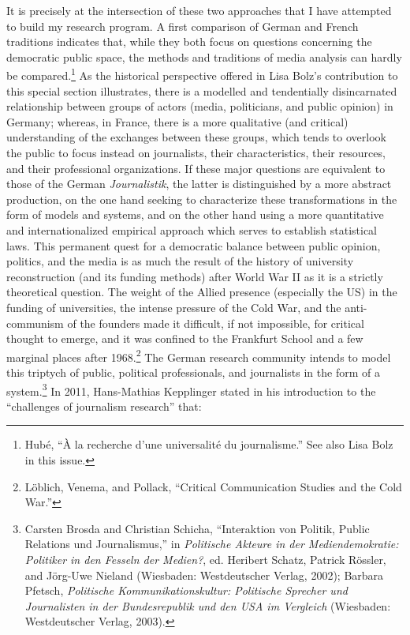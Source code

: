 \documentclass{tufte-handout}
\begin{document}
It is precisely at the intersection of these two approaches that I have
attempted to build my research program. A first comparison of German and
French traditions indicates that, while they both focus on questions
concerning the democratic public space, the methods and traditions of
media analysis can hardly be compared.\footnote{Hubé, ``À la recherche
  d'une universalité du journalisme.'' See also Lisa Bolz in this issue.}
As the historical perspective offered in Lisa Bolz's contribution to
this special section illustrates, there is a modelled and tendentially
disincarnated relationship between groups of actors (media, politicians,
and public opinion) in Germany; whereas, in France, there is a more
qualitative (and critical) understanding of the exchanges between these
groups, which tends to overlook the public to focus instead on
journalists, their characteristics, their resources, and their
professional organizations. If these major questions are equivalent to
those of the German \emph{Journalistik}, the latter is distinguished by
a more abstract production, on the one hand seeking to characterize
these transformations in the form of models and systems, and on the
other hand using a more quantitative and internationalized empirical
approach which serves to establish statistical laws. This permanent
quest for a democratic balance between public opinion, politics, and the
media is as much the result of the history of university reconstruction
(and its funding methods) after World War II as it is a strictly
theoretical question. The weight of the Allied presence (especially the
US) in the funding of universities, the intense pressure of the Cold
War, and the anti-communism of the founders made it difficult, if not
impossible, for critical thought to emerge, and it was confined to the
Frankfurt School and a few marginal places after 1968.\footnote{Löblich,
  Venema, and Pollack, ``Critical Communication Studies and the Cold
  War.''} The German research community intends to model this triptych
of public, political professionals, and journalists in the form of a
system.\footnote{Carsten Brosda and Christian Schicha, ``Interaktion von
  Politik, Public Relations und Journalismus,'' in \emph{Politische
  Akteure in der Mediendemokratie: Politiker in den Fesseln der
  Medien?}, ed. Heribert Schatz, Patrick Rössler, and Jörg-Uwe Nieland
  (Wiesbaden: Westdeutscher Verlag, 2002); Barbara Pfetsch,
  \emph{Politische Kommunikationskultur: Politische Sprecher und
  Journalisten in der Bundesrepublik und den USA im Vergleich}
  (Wiesbaden: Westdeutscher Verlag, 2003).} In 2011, Hans-Mathias
Kepplinger stated in his introduction to the ``challenges of journalism
research'' that:
\end{document}
